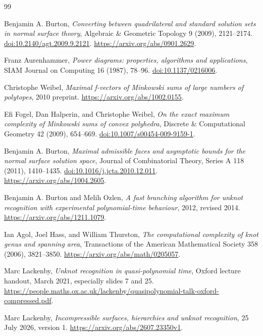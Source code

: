 \begin{thebibliography}{99}
\small
\setlength{\itemsep}{3pt}
\setlength{\parskip}{0pt}

Benjamin A. Burton,
\emph{Converting between quadrilateral and standard solution sets
in normal surface theory},
Algebraic \& Geometric Topology 9 (2009), 2121--2174.
\href{https://doi.org/10.2140/agt.2009.9.2121}{doi:10.2140/agt.2009.9.2121}.
\url{https://arxiv.org/abs/0901.2629}.

Franz Aurenhammer,
\emph{Power diagrams: properties, algorithms and applications},
SIAM Journal on Computing 16 (1987), 78--96.
\href{https://doi.org/10.1137/0216006}{doi:10.1137/0216006}.

Christophe Weibel,
\emph{Maximal f-vectors of Minkowski sums of large numbers of polytopes},
2010 preprint.
\url{https://arxiv.org/abs/1002.0155}.

Efi Fogel, Dan Halperin, and Christophe Weibel,
\emph{On the exact maximum complexity of Minkowski sums of convex polyhedra},
Discrete \& Computational Geometry 42 (2009), 654--669.
\href{https://doi.org/10.1007/s00454-009-9159-1}{doi:10.1007/s00454-009-9159-1}.

Benjamin A. Burton,
\emph{Maximal admissible faces and asymptotic bounds for the normal
surface solution space},
Journal of Combinatorial Theory, Series A 118 (2011), 1410--1435.
\href{https://doi.org/10.1016/j.jcta.2010.12.011}{doi:10.1016/j.jcta.2010.12.011}.
\url{https://arxiv.org/abs/1004.2605}.

Benjamin A. Burton and Melih Ozlen,
\emph{A fast branching algorithm for unknot recognition with
experimental polynomial-time behaviour},
2012, revised 2014.
\url{https://arxiv.org/abs/1211.1079}.

Ian Agol, Joel Hass, and William Thurston,
\emph{The computational complexity of knot genus and spanning area},
Transactions of the American Mathematical Society 358 (2006),
3821--3850.
\url{https://arxiv.org/abs/math/0205057}.

Marc Lackenby,
\emph{Unknot recognition in quasi-polynomial time},
Oxford lecture handout, March 2021, especially slides 7 and 25.
\url{https://people.maths.ox.ac.uk/lackenby/quasipolynomial-talk-oxford-compressed.pdf}.

Marc Lackenby,
\emph{Incompressible surfaces, hierarchies and unknot recognition},
25 July 2026, version 1.
\url{https://arxiv.org/abs/2607.23350v1}.


\end{thebibliography}
